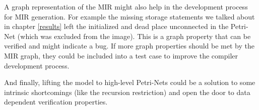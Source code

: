 A graph representation of the MIR might also help in the development process for MIR generation.
For example the missing storage statements we talked about in chapter \ref{results} left the initialized and dead place unconnected in the Petri-Net (which was excluded from the image).
This is a graph property that can be verified and might indicate a bug.
If more graph properties should be met by the MIR graph, they could be included into a test case to improve the compiler development process.

And finally, lifting the model to high-level Petri-Nets could be a solution to some intrinsic shortcomings (like the recursion restriction) and open the door to data dependent verification properties.
